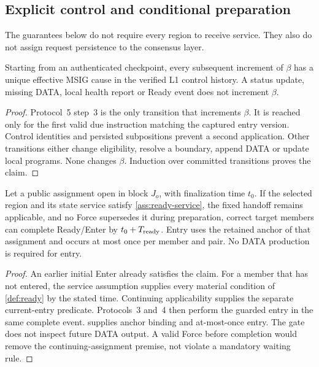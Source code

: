 \subsection{Explicit control and conditional preparation}
\label{sec:v4-progress}
The guarantees below do not require every region to receive service.
They also do not assign request persistence to the consensus layer.

\begin{proposition}
\label{prop:explicit-force}
Starting from an authenticated checkpoint, every subsequent increment
of $\beta$ has a unique effective MSIG cause in the verified L1 control
history. A status update, missing DATA, local health report or Ready event
does not increment $\beta$.
\end{proposition}
\begin{proof}
Protocol~5 step~3 is the only transition that increments $\beta$.
It is reached only for the first valid due instruction matching the
captured entry version. Control identities and persisted subpositions
prevent a second application. Other transitions either change
eligibility, resolve a boundary, append DATA or update local programs.
None changes $\beta$. Induction over committed transitions proves the claim.
\end{proof}

\begin{proposition}
\label{prop:ready-bound}
Let a public assignment open in block $J_o$, with finalization time
$t_0$. If the selected region and its state service satisfy
\cref{ass:ready-service}, the fixed handoff remains applicable, and no
Force supersedes it during preparation, correct target members can
complete Ready/Enter by $t_0+T_{\rm ready}$.
Entry uses the retained anchor of that assignment and occurs at most
once per member and pair. No DATA production is required for entry.
\end{proposition}
\begin{proof}
An earlier initial Enter already satisfies the claim. For a member
that has not entered, the service assumption supplies every material
condition of \cref{def:ready} by the stated time. Continuing applicability supplies
the separate current-entry predicate. Protocols~3 and~4 then perform the
guarded entry in the same complete event.
 supplies anchor binding and at-most-once
entry. The gate does not inspect future DATA output. A valid Force
before completion would remove the continuing-assignment premise,
not violate a mandatory waiting rule.
\end{proof}

